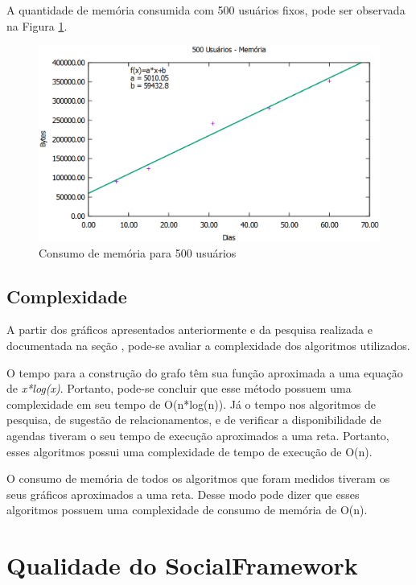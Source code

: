 A quantidade de memória consumida com 500 usuários fixos, pode ser observada na Figura \ref{500users_memoria}.

\newpage

\begin{figure}[!h]
	\centering
	\includegraphics[scale=0.55]{figuras/resultados/graficos/500_users_memoria.eps}
	\caption[Consumo de memória para 500 usuários]{Consumo de memória para 500 usuários}
	\label{500users_memoria}
\end{figure}

\subsection{Complexidade}

A partir dos gráficos apresentados anteriormente e da pesquisa realizada e documentada na seção , pode-se avaliar a complexidade dos algoritmos utilizados.

O tempo para a construção do grafo têm sua função aproximada a uma equação de \textit{x*log(x)}. Portanto, pode-se concluir que esse método possuem uma complexidade em seu tempo de O(n*log(n)). Já o tempo nos algoritmos de pesquisa, de sugestão de relacionamentos, e de verificar a disponibilidade de agendas tiveram o seu tempo de execução aproximados a uma reta. Portanto, esses algoritmos possui uma complexidade de tempo de execução de O(n).

O consumo de memória de todos os algoritmos que foram medidos tiveram os seus gráficos aproximados a uma reta. Desse modo pode dizer que esses algoritmos possuem uma complexidade de consumo de memória de O(n).

\section{Qualidade do SocialFramework}

